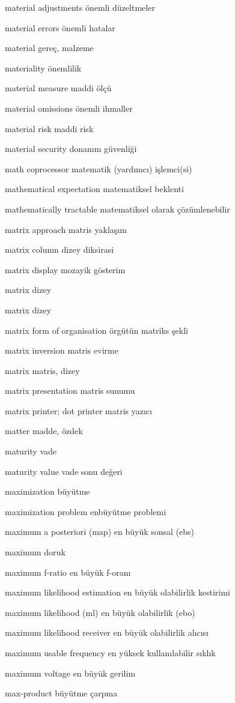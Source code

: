\documentclass[12pt,fleqn]{article}\usepackage{../../common}
\begin{document}
material adjustments önemli düzeltmeler

material errors önemli hatalar

material gereç, malzeme

materiality önemlilik

material measure maddi ölçü

material omissions önemli ihmaller

material risk maddi risk

material security donanım güvenliği

math coprocessor matematik (yardımcı) işlemci(si)

mathematical expectation matematiksel beklenti

mathematically tractable matematiksel olarak çözümlenebilir

matrix approach matris yaklaşım

matrix column dizey diksirasi

matrix display mozayik gösterim

matrix dizey

matrix dizey

matrix form of organisation örgütün matriks şekli

matrix inversion matris evirme

matrix matris, dizey

matrix presentation matris sunumu

matrix printer; dot printer matris yazıcı

matter madde, özdek

maturity vade

maturity value vade sonu değeri

maximization büyütme

maximization problem enbüyütme problemi

maximum a posteriori (map) en büyük sonsal (ebs)

maximum doruk

maximum f-ratio en büyük f-oranı

maximum likelihood estimation en büyük olabilirlik kestirimi

maximum likelihood (ml) en büyük olabilirlik (ebo)

maximum likelihood receiver en büyük olabilirlik alıcısı

maximum usable frequency en yüksek kullanılabilir sıklık

maximum voltage en büyük gerilim

max-product büyütme çarpma
\end{document}
